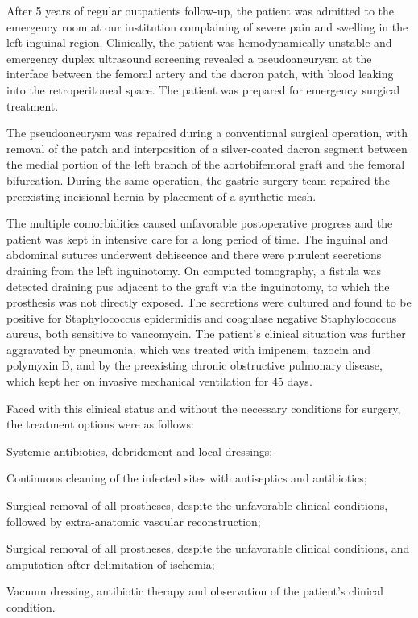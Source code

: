 \documentclass[numberinsection,times,10pt,spreadimages]{memoir}
\begin{document}
After 5 years of regular outpatients follow-up, the patient was admitted to the
emergency room at our institution complaining of severe pain and swelling in the
left inguinal region. Clinically, the patient was hemodynamically unstable and
emergency duplex ultrasound screening revealed a pseudoaneurysm at the interface
between the femoral artery and the dacron patch, with blood leaking into the
retroperitoneal space. The patient was prepared for emergency surgical
treatment.

The pseudoaneurysm was repaired during a conventional surgical operation, with
removal of the patch and interposition of a silver-coated dacron segment between
the medial portion of the left branch of the aortobifemoral graft and the
femoral bifurcation. During the same operation, the gastric surgery team
repaired the preexisting incisional hernia by placement of a synthetic mesh.

The multiple comorbidities caused unfavorable postoperative progress and the
patient was kept in intensive care for a long period of time. The inguinal and
abdominal sutures underwent dehiscence and there were purulent secretions
draining from the left inguinotomy. On computed tomography, a fistula was
detected draining pus adjacent to the graft via the inguinotomy, to which the
prosthesis was not directly exposed. The secretions were cultured and found to
be positive for Staphylococcus epidermidis and coagulase
negative Staphylococcus aureus, both sensitive to vancomycin.
The patient’s clinical situation was further aggravated by pneumonia, which was
treated with imipenem, tazocin and polymyxin B, and by the preexisting chronic
obstructive pulmonary disease, which kept her on invasive mechanical ventilation
for 45 days.

Faced with this clinical status and without the necessary conditions for
surgery,
the treatment options were as follows:

Systemic antibiotics, debridement and local dressings;

Continuous cleaning of the infected sites with antiseptics and
antibiotics;

Surgical removal of all prostheses, despite the unfavorable clinical
conditions, followed by extra-anatomic vascular reconstruction;

Surgical removal of all prostheses, despite the unfavorable clinical
conditions, and amputation after delimitation of ischemia;

Vacuum dressing, antibiotic therapy and observation of the patient’s
clinical condition.
\end{document}
